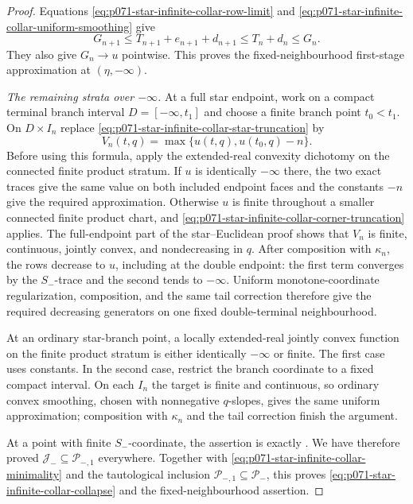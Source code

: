 \begin{proof}
Equations \eqref{eq:p071-star-infinite-collar-row-limit} and
\eqref{eq:p071-star-infinite-collar-uniform-smoothing} give
\[
 G_{n+1}\leq T_{n+1}+e_{n+1}+d_{n+1}
       \leq T_n+d_n\leq G_n.
\]
They also give $G_n\to u$ pointwise.  This proves the fixed-neighbourhood
first-stage approximation at $(\eta,-\infty)$.

\medskip\noindent
\emph{The remaining strata over $-\infty$.}
At a full star endpoint, work on a compact terminal branch interval
$D=[-\infty,t_1]$ and choose a finite branch point $t_0<t_1$.  On
$D\times I_n$ replace \eqref{eq:p071-star-infinite-collar-star-truncation}
by
\begin{equation}
             V_n(t,q)=\max\{u(t,q),u(t_0,q)-n\}.
\label{eq:p071-star-infinite-collar-corner-truncation}
\end{equation}
Before using this formula, apply the extended-real convexity dichotomy on
the connected finite product stratum.  If $u$ is identically $-\infty$
there, the two exact traces give the same value on both included endpoint
faces and the constants $-n$ give the required approximation.  Otherwise
$u$ is finite throughout a smaller connected finite product chart, and
\eqref{eq:p071-star-infinite-collar-corner-truncation} applies.
The full-endpoint part of the star--Euclidean proof shows that $V_n$ is
finite, continuous, jointly convex, and nondecreasing in $q$.  After
composition with $\kappa_n$, the rows decrease to $u$, including at the
double endpoint: the first term converges by the $S_-$-trace and the
second tends to $-\infty$.  Uniform monotone-coordinate regularization,
composition, and the same tail correction therefore give the required
decreasing generators on one fixed double-terminal neighbourhood.

At an ordinary star-branch point, a locally extended-real jointly convex
function on the finite product stratum is either identically $-\infty$ or
finite.  The first case uses constants.  In the second case, restrict the
branch coordinate to a fixed compact interval.  On each $I_n$ the target
is finite and continuous, so ordinary convex smoothing, chosen with
nonnegative $q$-slopes, gives the same uniform approximation; composition
with $\kappa_n$ and the tail correction finish the argument.

At a point with finite $S_-$-coordinate, the assertion is exactly
.  We have therefore proved
$\mathcal J_-\subseteq\mathcal P_{-,1}$ everywhere.  Together with
\eqref{eq:p071-star-infinite-collar-minimality} and the tautological
inclusion $\mathcal P_{-,1}\subseteq\mathcal P_-$, this proves
\eqref{eq:p071-star-infinite-collar-collapse} and the fixed-neighbourhood
assertion.
\end{proof}
